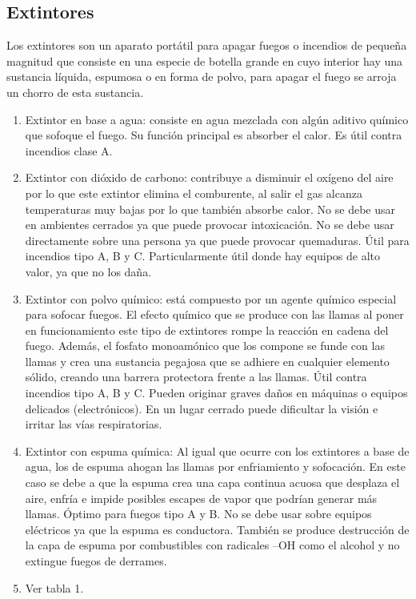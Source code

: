 \subsection{Extintores}
Los extintores son un aparato portátil para apagar fuegos o incendios de pequeña magnitud que consiste en una especie de botella grande en cuyo interior hay una sustancia líquida, espumosa o en forma de polvo, para apagar el fuego se arroja un chorro de esta sustancia.
\begin{enumerate}[resume]
  
  \item  Extintor en base a agua: consiste en agua mezclada con algún aditivo químico que sofoque el fuego. Su función principal es absorber el calor. Es útil contra incendios clase A.
  \item Extintor con dióxido de carbono: contribuye a disminuir el oxígeno del aire por lo que este extintor elimina el comburente, al salir el gas alcanza temperaturas muy bajas por lo que también absorbe calor. No se debe usar en ambientes cerrados ya que puede provocar intoxicación. No se debe usar directamente sobre una persona ya que puede provocar quemaduras. Útil para incendios tipo A, B y C. Particularmente útil donde hay equipos de alto valor, ya que no los daña.
  \item  Extintor con polvo químico: está compuesto por un agente químico especial para sofocar fuegos. El efecto químico que se produce con las llamas al poner en funcionamiento este tipo de extintores rompe la reacción en cadena del fuego. Además, el fosfato monoamónico que los compone se funde con las llamas y crea una sustancia pegajosa que se adhiere en cualquier elemento sólido, creando una barrera protectora frente a las llamas. Útil contra incendios tipo A, B y C. Pueden originar graves daños en máquinas o equipos delicados (electrónicos). En un lugar cerrado puede dificultar la visión e irritar las vías respiratorias. 
  \item 
   Extintor con espuma química: Al igual que ocurre con los extintores a base de agua, los de espuma ahogan las llamas por enfriamiento y sofocación. En este caso se debe a que la espuma crea una capa continua acuosa que desplaza el aire, enfría e impide posibles escapes de vapor que podrían generar más llamas. Óptimo para fuegos tipo A y B. No se debe usar sobre equipos eléctricos ya que la espuma es conductora. También se produce destrucción de la capa de espuma por combustibles con radicales –OH como el alcohol y no extingue fuegos de derrames.
   \item Ver tabla 1.

\end{enumerate}

